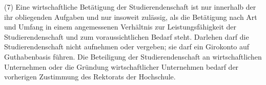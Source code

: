 \documentclass[
10pt,
a4paper,
twoside,								%
titlepage=false,							%
draft=false								%
]{scrartcl}
\begin{document}
(7) Eine wirtschaftliche Betätigung der Studierendenschaft ist nur innerhalb der ihr obliegenden Aufgaben und nur insoweit zulässig, als die Betätigung nach Art und Umfang in einem angemessenen Verhältnis zur Leistungsfähigkeit der Studierendenschaft und zum voraussichtlichen Bedarf steht. Darlehen darf die Studierendenschaft nicht aufnehmen oder vergeben; sie darf ein Girokonto auf Guthabenbasis führen. Die Beteiligung der Studierendenschaft an wirtschaftlichen Unternehmen oder die Gründung wirtschaftlicher Unternehmen bedarf der vorherigen Zustimmung des Rektorats der Hochschule.



\end{document}
